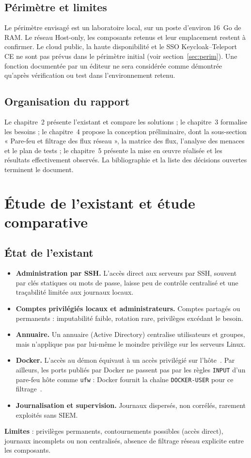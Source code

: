 \documentclass[11pt,a4paper]{report}
\begin{document}
\section{Périmètre et limites}
Le périmètre envisagé est un laboratoire local, sur un poste d'environ 16~Go de RAM. Le réseau Host-only, les composants retenus et leur emplacement restent à confirmer. Le cloud public, la haute disponibilité et le SSO Keycloak--Teleport CE ne sont pas prévus dans le périmètre initial (voir section~\ref{sec:perim}). Une fonction documentée par un éditeur ne sera considérée comme démontrée qu'après vérification ou test dans l'environnement retenu.

\section{Organisation du rapport}
Le chapitre~2 présente l'existant et compare les solutions ; le chapitre~3 formalise les besoins ; le chapitre~4 propose la conception préliminaire, dont la sous-section « Pare-feu et filtrage des flux réseau », la matrice des flux, l'analyse des menaces et le plan de tests ; le chapitre~5 présente la mise en œuvre réalisée et les résultats effectivement observés. La bibliographie et la liste des décisions ouvertes terminent le document.

\chapter{Étude de l'existant et étude comparative}

\section{État de l'existant}
\begin{itemize}
\item \textbf{Administration par SSH.} L'accès direct aux serveurs par SSH, souvent par clés statiques ou mots de passe, laisse peu de contrôle centralisé et une traçabilité limitée aux journaux locaux.
\item \textbf{Comptes privilégiés locaux et administrateurs.} Comptes partagés ou permanents : imputabilité faible, rotation rare, privilèges excédant le besoin.
\item \textbf{Annuaire.} Un annuaire (Active Directory) centralise utilisateurs et groupes, mais n'applique pas par lui-même le moindre privilège sur les serveurs Linux.
\item \textbf{Docker.} L'accès au démon équivaut à un accès privilégié sur l'hôte~\cite{docker-sec}. Par ailleurs, les ports publiés par Docker ne passent pas par les règles \texttt{INPUT} d'un pare-feu hôte comme \texttt{ufw} : Docker fournit la chaîne \texttt{DOCKER-USER} pour ce filtrage~\cite{docker-fw,baeldung-ufw}.
\item \textbf{Journalisation et supervision.} Journaux dispersés, non corrélés, rarement exploités sans SIEM.
\end{itemize}
\textbf{Limites} : privilèges permanents, contournements possibles (accès direct), journaux incomplets ou non centralisés, absence de filtrage réseau explicite entre les composants.
\end{document}
